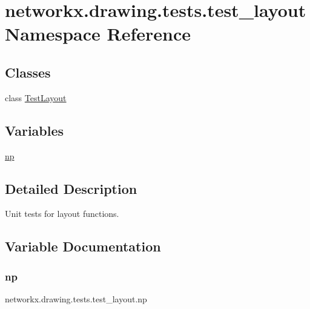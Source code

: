 \hypertarget{namespacenetworkx_1_1drawing_1_1tests_1_1test__layout}{}\section{networkx.\+drawing.\+tests.\+test\+\_\+layout Namespace Reference}
\label{namespacenetworkx_1_1drawing_1_1tests_1_1test__layout}
\subsection*{Classes}
\begin{DoxyCompactItemize}
\item 
class \hyperlink{classnetworkx_1_1drawing_1_1tests_1_1test__layout_1_1TestLayout}{Test\+Layout}
\end{DoxyCompactItemize}
\subsection*{Variables}
\begin{DoxyCompactItemize}
\item 
\hyperlink{namespacenetworkx_1_1drawing_1_1tests_1_1test__layout_a0d0e631f3f52fc58195393eeda4cb403}{np}
\end{DoxyCompactItemize}


\subsection{Detailed Description}
\begin{DoxyVerb}Unit tests for layout functions.\end{DoxyVerb}
 

\subsection{Variable Documentation}
\mbox{\label{namespacenetworkx_1_1drawing_1_1tests_1_1test__layout_a0d0e631f3f52fc58195393eeda4cb403}} 
\subsubsection{\texorpdfstring{np}{np}}
{\footnotesize\ttfamily networkx.\+drawing.\+tests.\+test\+\_\+layout.\+np}

